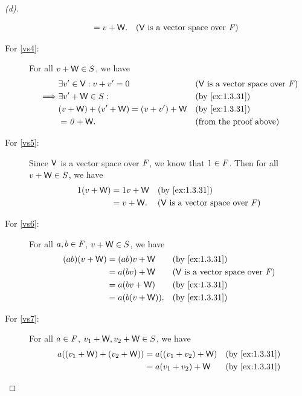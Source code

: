 \begin{proof}[(d)]
\begin{description}
\begin{align*}
                              & = v + \mathsf{W}.        &  & \text{(\(\mathsf{V}\) is a vector space over \(\mathit{F}\))}
      \end{align*}
    \item[For \ref{vs4}:]
      For all \(v + \mathsf{W} \in S\), we have
      \begin{align*}
                 & \exists v' \in \V : v + v' = 0       &  & \text{(\(\V\) is a vector space over \(\F\))} \\
        \implies & \exists v' + \W \in S :              &  & \text{(by \cref{ex:1.3.31})}                  \\
                 & (v + \W) + (v' + \W) = (v + v') + \W &  & \text{(by \cref{ex:1.3.31})}                  \\
                 & = \zv + \W.                          &  & \text{(from the proof above)}
      \end{align*}
    \item[For \ref{vs5}:]
      Since \(\mathsf{V}\) is a vector space over \(\mathit{F}\), we know that \(1 \in \mathit{F}\).
      Then for all \(v + \mathsf{W} \in S\), we have
      \begin{align*}
        1(v + \W) & = 1v + \W &  & \text{(by \cref{ex:1.3.31})}                  \\
                  & = v + \W. &  & \text{(\(\V\) is a vector space over \(\F\))}
      \end{align*}
    \item[For \ref{vs6}:]
      For all \(a, b \in \mathit{F}\), \(v + \mathsf{W} \in S\), we have
      \begin{align*}
        (ab) (v + \W) & = (ab)v + \W    &  & \text{(by \cref{ex:1.3.31})}                  \\
                      & = a(bv) + \W    &  & \text{(\(\V\) is a vector space over \(\F\))} \\
                      & = a(bv + \W)    &  & \text{(by \cref{ex:1.3.31})}                  \\
                      & = a(b(v + \W)). &  & \text{(by \cref{ex:1.3.31})}
      \end{align*}
    \item[For \ref{vs7}:]
      For all \(a \in \mathit{F}\), \(v_1 + \mathsf{W}, v_2 + \mathsf{W} \in S\), we have
      \begin{align*}
        a((v_1 + \W) + (v_2 + \W)) & = a((v_1 + v_2) + \W)        &  & \text{(by \cref{ex:1.3.31})}                  \\
                                   & = a(v_1 + v_2) + \W          &  & \text{(by \cref{ex:1.3.31})}                  \\

\end{align*}
\end{description}
\end{proof}
